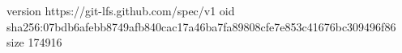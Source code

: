 version https://git-lfs.github.com/spec/v1
oid sha256:07bdb6afebb8749afb840cac17a46ba7fa89808cfe7e853c41676bc309496f86
size 174916

